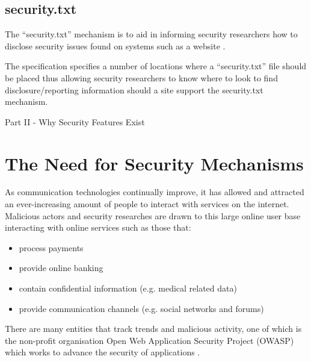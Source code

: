 \documentclass{mscreport}
\begin{document}
\subsection{security.txt}
The ``security.txt'' mechanism is to aid in informing security researchers how to disclose security issues found on systems such as a website \cite{Foudil2021-vh}.

\vspace{0.3cm} \noindent
The specification specifies a number of locations where a ``security.txt'' file should be placed thus allowing security researchers to know where to look to find disclosure/reporting information should a site support the security.txt mechanism.

\newpage

\vspace*{\fill}
\begin{center}
\begin{huge}
Part II - Why Security Features Exist
\end{huge}
\end{center}
\vspace{\fill}

\newpage

\section{The Need for Security Mechanisms}
\label{section:need_for_security_mechanisms}

As communication technologies continually improve, it has allowed and attracted an ever-increasing amount of people to interact with services on the internet. Malicious actors and security researches are drawn to this large online user base interacting with online services such as those that:
\begin{itemize}
	\setlength\itemsep{0.1em}
	\item process payments \cite{Herman2019-zb}
	\item provide online banking \cite{Gezer2019-oy}
	\item contain confidential information (e.g. medical related data) \cite{Mrdjenovich2020-vz}
	\item provide communication channels (e.g. social networks and forums)
\end{itemize}

\vspace{0.3cm} \noindent
There are many entities that track trends and malicious activity, one of which is the non-profit organisation Open Web Application Security Project (OWASP) which works to advance the security of applications \cite{noauthor_undated-ta,Kellezi2021-nd}.
\end{document}
